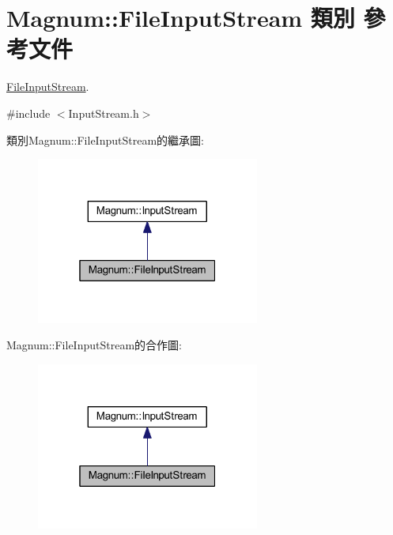 \hypertarget{class_magnum_1_1_file_input_stream}{}\section{Magnum\+:\+:File\+Input\+Stream 類別 參考文件}
\label{class_magnum_1_1_file_input_stream}


\hyperlink{class_magnum_1_1_file_input_stream}{File\+Input\+Stream}.  




{\ttfamily \#include $<$Input\+Stream.\+h$>$}



類別\+Magnum\+:\+:File\+Input\+Stream的繼承圖\+:\nopagebreak
\begin{figure}[H]
\begin{center}
\leavevmode
\includegraphics[width=208pt]{class_magnum_1_1_file_input_stream__inherit__graph}
\end{center}
\end{figure}


Magnum\+:\+:File\+Input\+Stream的合作圖\+:\nopagebreak
\begin{figure}[H]
\begin{center}
\leavevmode
\includegraphics[width=208pt]{class_magnum_1_1_file_input_stream__coll__graph}
\end{center}
\end{figure}
